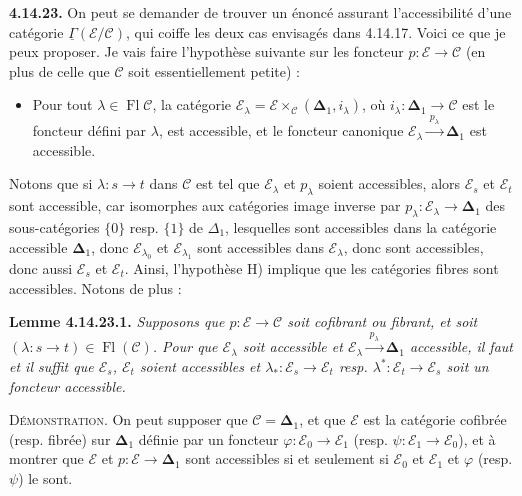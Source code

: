 \documentclass[11pt]{article}
\newcommand{\msp}[1]{\marginpar{\footnotesize [#1]}}
\newcommand{\Fl}{\operatorname{Fl}}
\newcommand{\uGamma}{\underline{\Gamma}}
\newcommand{\bDelta}{\boldsymbol{\Delta}}
\begin{document}
\msp{page 409}

\textbf{4.14.23.} On peut se demander de trouver un énoncé assurant l'accessibilité d'une catégorie $\uGamma(\mathcal{E}/\mathcal{C})$, qui coiffe les deux cas envisagés dans 4.14.17. Voici ce que je peux proposer. Je vais faire l'hypothèse suivante sur les foncteur $p:\mathcal{E}\longrightarrow\mathcal{C}$ (en plus de celle que $\mathcal{C}$ soit essentiellement petite) : %

\begin{itemize}[leftmargin=*]
\item[H)] Pour tout $\lambda\in\Fl\mathcal{C}$, la catégorie $\mathcal{E}_\lambda=\mathcal{E}\times_{\mathcal{C}}(\bDelta_1,i_\lambda)$, où $i_\lambda:\bDelta_1\longrightarrow\mathcal{C}$ est le foncteur défini par $\lambda$, est accessible, et le foncteur canonique $\mathcal{E}_\lambda\xrightarrow{\;p_\lambda\;}\bDelta_1$ est accessible.
\end{itemize}

Notons que si $\lambda:s\longrightarrow t$ dans $\mathcal{C}$ est tel que $\mathcal{E}_\lambda$ et $p_\lambda$ soient accessibles, alors $\mathcal{E}_s$ et $\mathcal{E}_t$ sont accessible, car isomorphes aux catégories image inverse par $p_\lambda:\mathcal{E}_\lambda\longrightarrow\bDelta_1$ des sous-catégories $\{0\}$ resp. $\{1\}$ de $\Delta_1$, lesquelles sont accessibles dans la catégorie accessible $\bDelta_1$, donc %
\msp{page 410}
$\mathcal{E}_{\lambda_0}$ et $\mathcal{E}_{\lambda_1}$ sont accessibles dans $\mathcal{E}_\lambda$, donc sont accessibles, donc aussi $\mathcal{E}_s$ et $\mathcal{E}_t$. Ainsi, l'hypothèse H) implique que les catégories fibres sont accessibles. Notons de plus :

\textbf{Lemme 4.14.23.1.} \textit{Supposons que $p:\mathcal{E}\longrightarrow\mathcal{C}$ soit cofibrant ou fibrant, et soit $(\lambda:s\longrightarrow t)\in\Fl(\mathcal{C})$. Pour que $\mathcal{E}_\lambda$ soit accessible et $\mathcal{E}_\lambda\xrightarrow{\;p_\lambda\;}\bDelta_1$ accessible, il faut et il suffit que $\mathcal{E}_s$, $\mathcal{E}_t$ soient accessibles et $\lambda_*:\mathcal{E}_s\longrightarrow\mathcal{E}_t$ resp. $\lambda^*:\mathcal{E}_t\longrightarrow\mathcal{E}_s$ soit un foncteur accessible.}

\textsc{Démonstration.} On peut supposer que $\mathcal{C}=\bDelta_1$, et que $\mathcal{E}$ est la catégorie cofibrée (resp. fibrée) sur $\bDelta_1$ définie par un foncteur $\varphi:\mathcal{E}_0\longrightarrow\mathcal{E}_1$ (resp. $\psi:\mathcal{E}_1\longrightarrow\mathcal{E}_0$), et à montrer que $\mathcal{E}$ et $p:\mathcal{E}\longrightarrow\bDelta_1$ sont accessibles si et seulement si $\mathcal{E}_0$ et $\mathcal{E}_1$ et $\varphi$ (resp. $\psi$) le sont.
\end{document}
